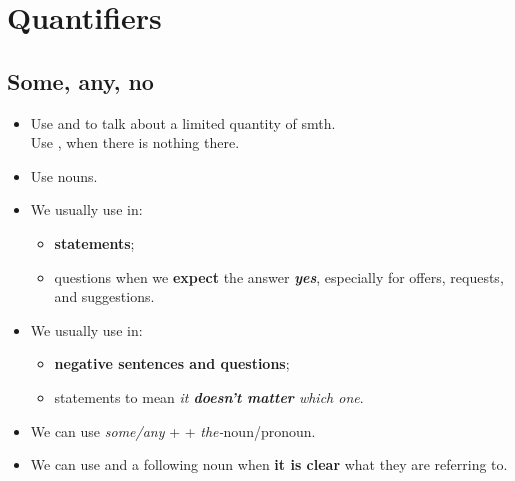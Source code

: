 \section{Quantifiers}

\subsection{Some, any, no}
\begin{itemize}
    \item Use  and  to talk about a limited quantity of smth.\\
    Use ,  when there is nothing there.
    \item Use  nouns.
    \item We usually use  in:
    \begin{itemize}
        \item \textbf{statements};
        \item questions when we \textbf{expect} the answer \textit{\textbf{yes}},
        especially for offers, requests, and suggestions.
    \end{itemize}
    \item We usually use  in:
    \begin{itemize}
        \item \textbf{negative sentences and questions};
        \item statements to mean \textit{it \textbf{doesn't matter} which one}.
    \end{itemize}
    \item We can use \textit{some/any} +  + \textit{the-}noun/pronoun.
    \item We can use  and   a following noun
    when \textbf{it is clear} what they are referring to.
\end{itemize}

